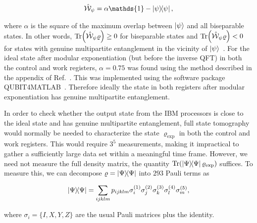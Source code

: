 \begin{align}
    \hat{\mathcal{W}}_{\psi} = \alpha \mathds{1} - \op{\psi}{\psi},
\end{align}

\noindent
where $\alpha$ is the square of the maximum overlap between $\ket{\psi}$ and all biseparable states. In other words, $\Tr(\hat{\mathcal{W}}_{\psi}\varrho) \geq 0$ for biseparable states and $\Tr(\hat{\mathcal{W}}_{\psi}\varrho) < 0$ for states with genuine multipartite entanglement in the vicinity of $\ket{\psi}$~\cite{Bourennane_2004}. For the ideal state after modular exponentiation (but before the inverse \acs{QFT}) in both the control and work registers, $\alpha=0.75$ was found using the method described in the appendix of Ref.~\cite{Bourennane_2004}. This was implemented using the software package QUBIT4MATLAB~\cite{Toth_2008}. Therefore ideally the state in both registers after modular exponentiation has genuine multipartite entanglement.

\bigskip
\noindent
In order to check whether the output state from the IBM processors is close to the ideal state and has genuine multipartite entanglement, full state tomography would normally be needed to characterize the state $\varrho_\text{exp}$ in both the control and work registers. This would require $3^5$ measurements, making it impractical to gather a sufficiently large data set within a meaningful time frame. However, we need not measure the full density matrix, the quantity $\Tr(\op{\Psi}{\Psi}\varrho_\text{exp})$ suffices. To measure this, we can decompose $\varrho=\op{\Psi}{\Psi}$ into $293$ Pauli terms as

\begin{align}
    \op{\Psi}{\Psi} = \displaystyle\sum_{ijklm} p_{ijklm} \sigma_i^{(1)}\sigma_j^{(2)}\sigma_k^{(3)}\sigma_l^{(4)}\sigma_m^{(5)},
\end{align}

\noindent
where $\sigma_{i} = \{I, X, Y, Z\}$ are the usual Pauli matrices plus the identity. 

\bigskip

